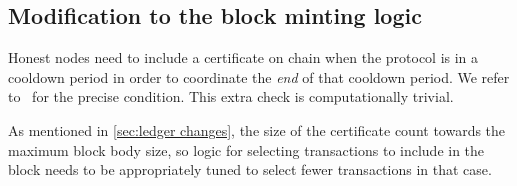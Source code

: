 \subsection{Modification to the block minting logic}\label{sec:modified block mint}

Honest nodes need to include a certificate on chain when the protocol is in a cooldown period in order to coordinate the \emph{end} of that cooldown period.
We refer to~\cite[Block creation]{peras-cip} for the precise condition.
This extra check is computationally trivial.

As mentioned in \cref{sec:ledger changes}, the size of the certificate count towards the maximum block body size, so logic for selecting transactions to include in the block needs to be appropriately tuned to select fewer transactions in that case.


